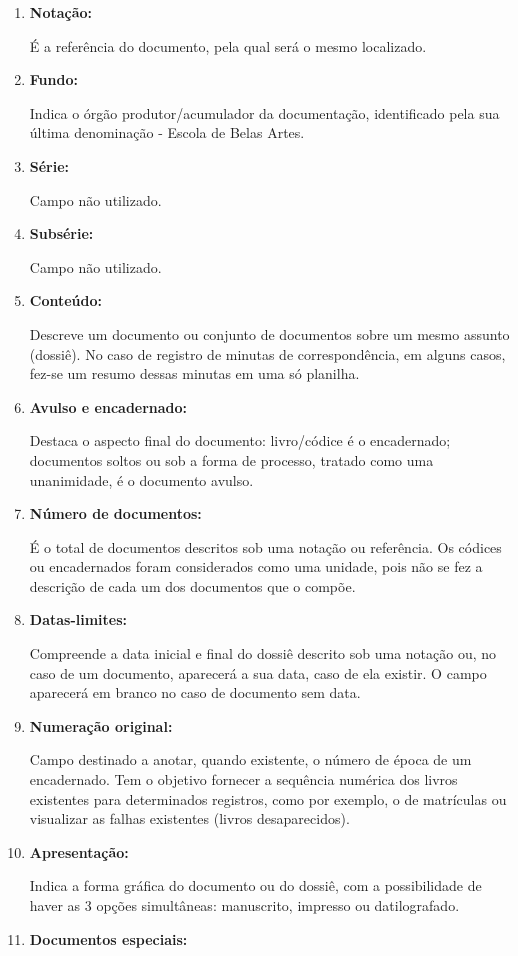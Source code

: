 \begin{enumerate}
	\item \textbf{Notação:}
	
	É a referência do documento, pela qual será o mesmo localizado.
	\item \textbf{Fundo:}
	
	Indica o órgão produtor/acumulador da documentação, identificado pela sua última denominação - Escola de Belas Artes.
	\item \textbf{Série:}
	
	Campo não utilizado.
	\item \textbf{Subsérie:}
	
	Campo não utilizado.
	\item \textbf{Conteúdo:}
	
	Descreve um documento ou conjunto de documentos sobre um mesmo assunto (dossiê). No caso de registro de minutas de correspondência, em alguns casos, fez-se um resumo dessas minutas em uma só planilha.
	\item \textbf{Avulso e encadernado:}
	
	Destaca o aspecto final do documento: livro/códice é o encadernado; documentos soltos ou sob a forma de processo, tratado como uma unanimidade, é o documento avulso.
	\item \textbf{Número de documentos:}
	
	É o total de documentos descritos sob uma notação ou referência. Os códices ou encadernados foram considerados como uma unidade, pois não se fez a descrição de cada um dos documentos que o compõe.
	\item \textbf{Datas-limites:}
	
	Compreende a data inicial e final do dossiê descrito sob uma notação ou, no caso de um documento, aparecerá a sua data, caso de ela existir. O campo aparecerá em branco no caso de documento sem data.
	\item \textbf{Numeração original:}
	
	Campo destinado a anotar, quando existente, o número de época de um encadernado. Tem o objetivo fornecer a sequência numérica dos livros existentes para determinados registros, como por exemplo, o de matrículas ou visualizar as falhas existentes (livros desaparecidos).
	\item \textbf{Apresentação:}
	
	Indica a forma gráfica do documento ou do dossiê, com a possibilidade de haver as 3 opções simultâneas: manuscrito, impresso ou datilografado.
	\item \textbf{Documentos especiais:}
	

\end{enumerate}
